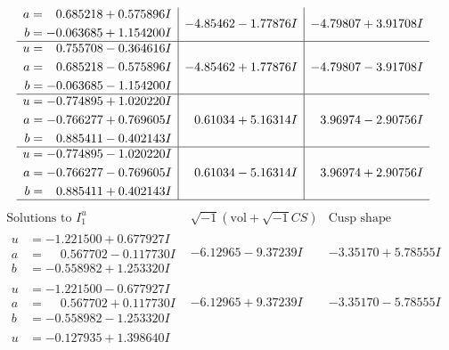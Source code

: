\documentclass[1p]{elsarticle_modified}
\theoremstyle{definition}
\newcommand{\I}{\sqrt{-1}}
\begin{document}
$$\begin{array}{c|c|c}
\begin{aligned}
a &= \phantom{-}0.685218 + 0.575896 I \\
b &= -0.063685 + 1.154200 I\end{aligned}
 & -4.85462 - 1.77876 I & -4.79807 + 3.91708 I \\ \hline\begin{aligned}
u &= \phantom{-}0.755708 - 0.364616 I \\
a &= \phantom{-}0.685218 - 0.575896 I \\
b &= -0.063685 - 1.154200 I\end{aligned}
 & -4.85462 + 1.77876 I & -4.79807 - 3.91708 I \\ \hline\begin{aligned}
u &= -0.774895 + 1.020220 I \\
a &= -0.766277 + 0.769605 I \\
b &= \phantom{-}0.885411 - 0.402143 I\end{aligned}
 & \phantom{-}0.61034 + 5.16314 I & \phantom{-}3.96974 - 2.90756 I \\ \hline\begin{aligned}
u &= -0.774895 - 1.020220 I \\
a &= -0.766277 - 0.769605 I \\
b &= \phantom{-}0.885411 + 0.402143 I\end{aligned}
 & \phantom{-}0.61034 - 5.16314 I & \phantom{-}3.96974 + 2.90756 I\\
 \hline 
 \end{array}$$\newpage$$\begin{array}{c|c|c}  
\text{Solutions to }I^u_{1}& \I (\text{vol} + \sqrt{-1}CS) & \text{Cusp shape}\\
 \hline 
\begin{aligned}
u &= -1.221500 + 0.677927 I \\
a &= \phantom{-}0.567702 - 0.117730 I \\
b &= -0.558982 + 1.253320 I\end{aligned}
 & -6.12965 - 9.37239 I & -3.35170 + 5.78555 I \\ \hline\begin{aligned}
u &= -1.221500 - 0.677927 I \\
a &= \phantom{-}0.567702 + 0.117730 I \\
b &= -0.558982 - 1.253320 I\end{aligned}
 & -6.12965 + 9.37239 I & -3.35170 - 5.78555 I \\ \hline\begin{aligned}
u &= -0.127935 + 1.398640 I \\

\end{aligned}
\end{array}$$
\end{document}
